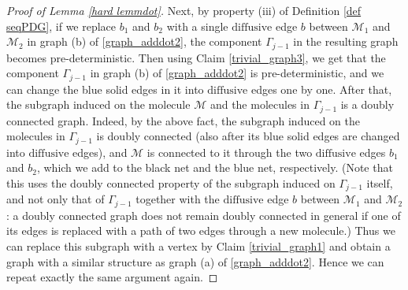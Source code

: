 \documentclass{article}
\newcommand{\1}{\mathds{1}}
\numberwithin{equation}{section}
\renewcommand{\cal}{\mathcal}
\newcommand{\dashed}{\text{diffusive}}
\theoremstyle{plain} %
\theoremstyle{remark}
\newcommand{\Iso}{{\mathcal I}}
\begin{document}
\begin{proof}[Proof of Lemma \ref{hard lemmdot}]
	
Next, by property (iii) of Definition \ref{def seqPDG}, if we replace $b_1$ and $b_2$ with a single $\dashed$ edge $b$ between $\cal M_1$ and $\cal M_2$ in graph (b) of \eqref{graph_adddot2}, the component $\Gamma_{j-1}$ in the resulting graph becomes pre-deterministic.  
Then using Claim \ref{trivial_graph3}, we get that the component $\Gamma_{j-1}$ in graph (b) of \eqref{graph_adddot2} is pre-deterministic, and we can change the blue solid edges in it into $\dashed$ edges one by one. %
After that, the subgraph induced on the molecule $\cal M$ and the molecules in $\Gamma_{j-1}$ is a doubly connected graph. Indeed, by the above fact, the subgraph induced on the molecules in $\Gamma_{j-1}$ is doubly connected (also after its blue solid edges are changed into $\dashed$ edges), and $\cal M$ is connected to it through the two $\dashed$ edges $b_1$ and $b_2$, which we add to the black net and the blue net, respectively. (Note that this uses the doubly connected property of the subgraph induced on $\Gamma_{j-1}$ itself, and not only that of $\Gamma_{j-1}$ together with the $\dashed$ edge $b$ between $\cal M_1$ and $\cal M_2$: a doubly connected graph does not remain doubly connected in general if one of its edges is replaced with a path of two edges through a new molecule.) Thus we can replace this subgraph with a vertex by Claim \ref{trivial_graph1} and obtain a graph with a similar structure as graph (a) of \eqref{graph_adddot2}.
Hence we can repeat exactly the same argument again. 
	

\end{proof}
\end{document}
